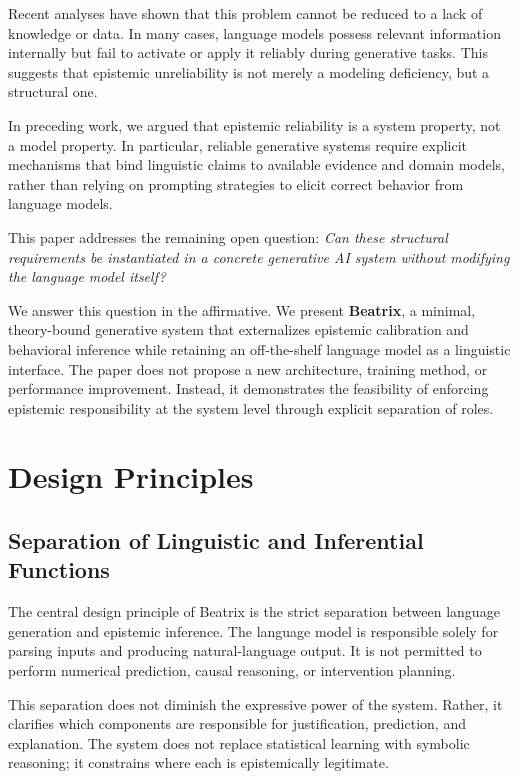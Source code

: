 \documentclass[11pt,a4paper]{article}
\begin{document}
Recent analyses have shown that this problem cannot be reduced to a lack of knowledge or data. In many cases, language models possess relevant information internally but fail to activate or apply it reliably during generative tasks. This suggests that epistemic unreliability is not merely a modeling deficiency, but a structural one.

In preceding work, we argued that epistemic reliability is a system property, not a model property. In particular, reliable generative systems require explicit mechanisms that bind linguistic claims to available evidence and domain models, rather than relying on prompting strategies to elicit correct behavior from language models.

This paper addresses the remaining open question: \emph{Can these structural requirements be instantiated in a concrete generative AI system without modifying the language model itself?}

We answer this question in the affirmative. We present \textbf{Beatrix}, a minimal, theory-bound generative system that externalizes epistemic calibration and behavioral inference while retaining an off-the-shelf language model as a linguistic interface. The paper does not propose a new architecture, training method, or performance improvement. Instead, it demonstrates the feasibility of enforcing epistemic responsibility at the system level through explicit separation of roles.


\section{Design Principles}

\subsection{Separation of Linguistic and Inferential Functions}

The central design principle of Beatrix is the strict separation between language generation and epistemic inference. The language model is responsible solely for parsing inputs and producing natural-language output. It is not permitted to perform numerical prediction, causal reasoning, or intervention planning.

This separation does not diminish the expressive power of the system. Rather, it clarifies which components are responsible for justification, prediction, and explanation. The system does not replace statistical learning with symbolic reasoning; it constrains where each is epistemically legitimate.
\end{document}
